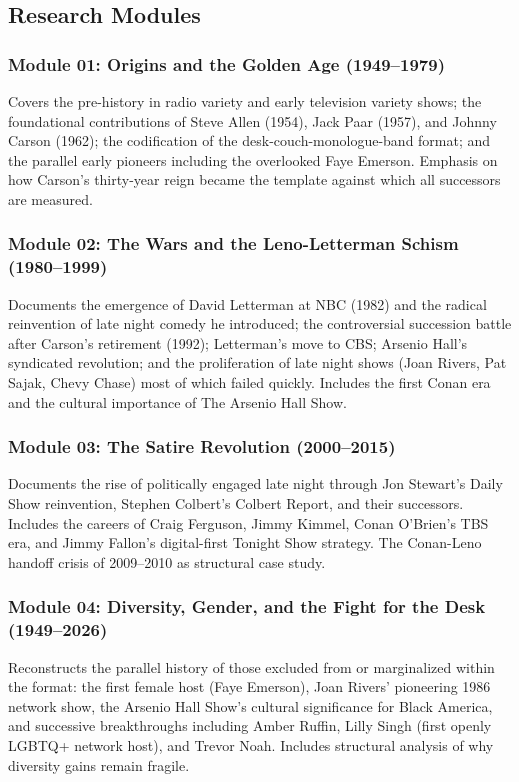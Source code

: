 \documentclass[11pt,letterpaper]{article}
\begin{document}
\subsection{Research Modules}

\subsubsection{Module 01: Origins and the Golden Age (1949--1979)}
Covers the pre-history in radio variety and early television variety shows; the foundational contributions of Steve Allen (1954), Jack Paar (1957), and Johnny Carson (1962); the codification of the desk-couch-monologue-band format; and the parallel early pioneers including the overlooked Faye Emerson. Emphasis on how Carson's thirty-year reign became the template against which all successors are measured.

\subsubsection{Module 02: The Wars and the Leno-Letterman Schism (1980--1999)}
Documents the emergence of David Letterman at NBC (1982) and the radical reinvention of late night comedy he introduced; the controversial succession battle after Carson's retirement (1992); Letterman's move to CBS; Arsenio Hall's syndicated revolution; and the proliferation of late night shows (Joan Rivers, Pat Sajak, Chevy Chase) most of which failed quickly. Includes the first Conan era and the cultural importance of The Arsenio Hall Show.

\subsubsection{Module 03: The Satire Revolution (2000--2015)}
Documents the rise of politically engaged late night through Jon Stewart's Daily Show reinvention, Stephen Colbert's Colbert Report, and their successors. Includes the careers of Craig Ferguson, Jimmy Kimmel, Conan O'Brien's TBS era, and Jimmy Fallon's digital-first Tonight Show strategy. The Conan-Leno handoff crisis of 2009--2010 as structural case study.

\subsubsection{Module 04: Diversity, Gender, and the Fight for the Desk (1949--2026)}
Reconstructs the parallel history of those excluded from or marginalized within the format: the first female host (Faye Emerson), Joan Rivers' pioneering 1986 network show, the Arsenio Hall Show's cultural significance for Black America, and successive breakthroughs including Amber Ruffin, Lilly Singh (first openly LGBTQ+ network host), and Trevor Noah. Includes structural analysis of why diversity gains remain fragile.
\end{document}
